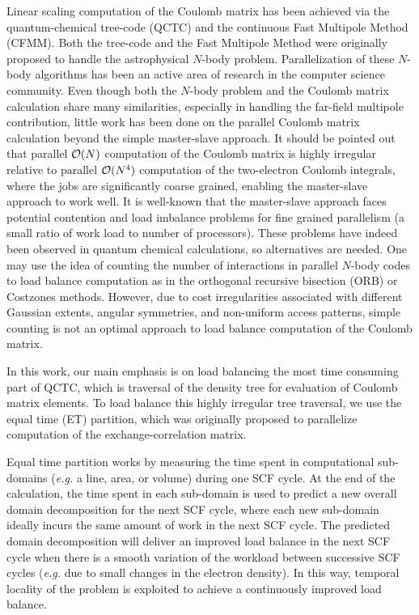 \commentoutA{\documentclass[prl,aps,twocolumn,twocolumngrid,superbib]{revtex4}}
\begin{document}
Linear scaling computation of the Coulomb matrix has been achieved via
the quantum-chemical tree-code
(QCTC)\cite{MChallacombe96,MChallacombe96B,MChallacombe97} and the
continuous Fast Multipole Method
(CFMM)\cite{CWhite94B,CWhite96A,MStrain96}.  Both the
tree-code\cite{JBarnes86} and the Fast Multipole
Method\cite{LGreengard87,CRAnderson92} were originally proposed to
handle the astrophysical $N$-body problem.  Parallelization of these
$N$-body algorithms has been an active area of research in the
computer science
community\cite{MWarren92,AGrama94,MWarren95b,Singh93,Singh_95v27,YHu96,Grama_98v24,PGibbon02,Antonuccio-Delogu03}.
Even though both the $N$-body problem and the Coulomb matrix
calculation share many similarities, especially in handling the
far-field multipole contribution, little work has been done on the
parallel Coulomb matrix calculation beyond the simple master-slave
approach\cite{Sosa_98v19,Furlani_00v128,Sosa_00v26}.  It should be
pointed out that parallel ${\cal O}(N)$ computation of the Coulomb
matrix is highly irregular relative to parallel ${\cal O}(N^4)$
computation of the two-electron Coulomb integrals, where the jobs are
significantly coarse grained, enabling the master-slave approach to
work well.  It is well-known that the master-slave approach faces
potential contention and load imbalance problems for fine grained
parallelism\cite{BWilkinson99} (a small ratio of work load to number
of processors).  These problems have indeed been observed in quantum
chemical calculations\cite{Guerra_95,CGan03}, so alternatives are
needed.  One may use the idea of counting the number of interactions
in parallel $N$-body codes to load balance computation as in the
orthogonal recursive bisection (ORB)\cite{MWarren92} or Costzones
methods\cite{Singh93,Singh_95v27}.  However, due to cost
irregularities associated with different Gaussian extents, angular
symmetries, and non-uniform access patterns, simple counting is not an
optimal approach to load balance computation of the Coulomb matrix.

In this work, our main emphasis is on load balancing the most time
consuming part of QCTC, which is traversal of the density tree for
evaluation of Coulomb matrix elements. To load balance this highly
irregular tree traversal, we use the equal time (ET)
partition\cite{CGan03}, which was originally proposed to parallelize
computation of the exchange-correlation matrix.

Equal time partition works by measuring the time spent in
computational sub-domains ({\it e.g.} a line, area, or volume) during
one SCF cycle. At the end of the calculation, the time spent in each
sub-domain is used to predict a new overall domain decomposition for
the next SCF cycle, where each new sub-domain ideally incurs the same
amount of work in the next SCF cycle. The predicted domain
decomposition will deliver an improved load balance in the next SCF
cycle when there is a smooth variation of the workload between
successive SCF cycles ({\it e.g.} due to small changes in the electron
density).  In this way, temporal locality\cite{JPilkington96} of the
problem is exploited to achieve a continuously improved load balance.
\end{document}

